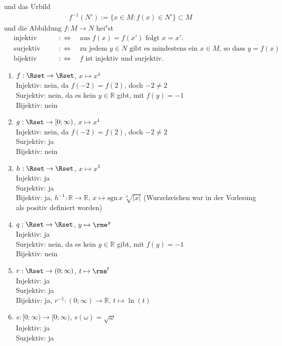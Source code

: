 \documentclass[12pt,answers]{exam}
\begin{document}
\begin{questions}
\begin{solution}
und das Urbild
\begin{align*}
f^{-1}(N'):=\{x\in M:f(x)\in N'\}\subset M
\end{align*}
und die Abbildung $f:M\to N$ hei"st
\begin{align*}
&\,\text{injektiv}\quad &&:\Leftrightarrow \quad \text{aus $f(x)=f(x')$ folgt $x=x'$.}
\\
&\,\text{surjektiv}\quad &&:\Leftrightarrow \quad \text{zu jedem $y\in N$ gibt es mindestens ein $x\in M$, so dass $y=f(x)$}
\\
&\,\text{bijektiv}\quad &&:\Leftrightarrow \quad \text{$f$ ist injektiv und surjektiv.}
\end{align*}
\begin{enumerate}
\item $f:\Rset\to\Rset$, $x\mapsto x^4$
\\ Injektiv: nein, da $f(-2)=f(2)$, doch $-2\neq 2$
\\ Surjektiv: nein, da es kein $y\in\mathbb{R}$ gibt, mit $f(y)=-1$
\\ Bijektiv: nein
\item $g:\Rset\to[0;\infty)$, $x\mapsto x^4$
\\ Injektiv: nein, da $f(-2)=f(2)$, doch $-2\neq 2$
\\ Surjektiv: ja
\\ Bijektiv: nein
\item $h:\Rset\to\Rset$, $x\mapsto x^3$
\\ Injektiv: ja
\\ Surjektiv: ja
\\ Bijektiv: ja, $h^{-1}:\mathbb{R}\to\mathbb{R},\,x\mapsto\mathrm{sgn}\,x\,\sqrt[3]{|x|}$ (Wurzelzeichen war in der Vorlesung als positiv definiert worden)
\item $q:\Rset\to\Rset$, $y\mapsto \rme^y$
\\ Injektiv: ja
\\ Surjektiv: nein, da es kein $y\in\mathbb{R}$ gibt, mit $f(y)=-1$
\\ Bijektiv: nein
\item $r:\Rset\to(0;\infty)$, $t\mapsto \rme^t$
\\ Injektiv: ja
\\ Surjektiv: ja
\\ Bijektiv: ja, $r^{-1}:(0;\infty)\to\mathbb{R},\,t\mapsto\ln(t)$
\item $s:[0;\infty)\to[0;\infty)$, $s(\omega)=\sqrt{\omega}$
\\ Injektiv: ja
\\ Surjektiv: ja

\end{enumerate}
\end{solution}
\end{questions}
\end{document}
